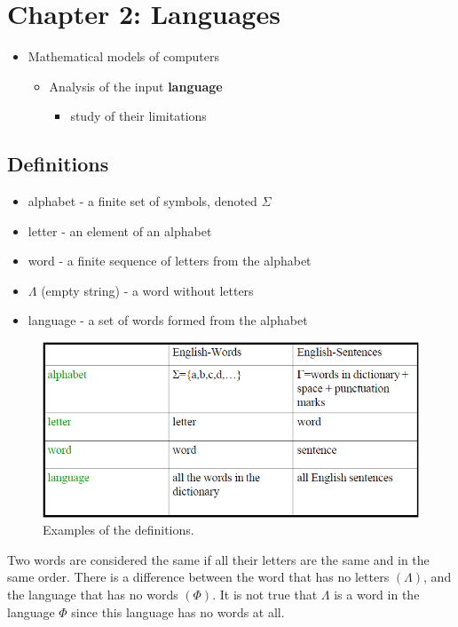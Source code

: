 \section{Chapter 2: Languages}

\begin{itemize}
    \item Mathematical models of computers
    \begin{itemize}
        \item Analysis of the input \textbf{language}
        \begin{itemize}
            \item study of their limitations
        \end{itemize}
    \end{itemize}
\end{itemize}

\subsection{Definitions}
\begin{itemize}
    \item alphabet - a finite set of symbols, denoted $\Sigma$
    \item letter - an element of an alphabet
    \item word - a finite sequence of letters from the alphabet
    \item $\Lambda$ (empty string) - a word without letters
    \item language - a set of words formed from the alphabet
\end{itemize}
\begin{figure}[!ht]
    \centering
    \includegraphics[width=\linewidth]{lecture 1/figures/definitions.png}
    \caption{Examples of the definitions.}
\end{figure}

Two words are considered the same if all their letters are the same and in the same order.
There is a difference between the word that has no letters $(\Lambda)$, and the language that has no words $(\Phi)$.
It is not true that $\Lambda$ is a word in the language $\Phi$ since this language has no words at all.

